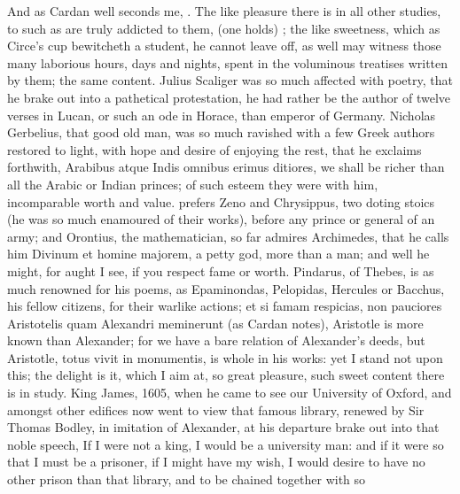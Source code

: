 {And as Cardan well seconds me, . The like pleasure there is in all other studies, to such as
are truly addicted to them,  (one holds) ; the like sweetness, which as Circe's cup bewitcheth a
student, he cannot leave off, as well may witness those many laborious
hours, days and nights, spent in the voluminous treatises written by
them; the same content. Julius Scaliger was so much affected with
poetry, that he brake out into a pathetical protestation, he had rather
be the author of twelve verses in Lucan, or such an ode in
Horace, than emperor of Germany. Nicholas Gerbelius, that
good old man, was so much ravished with a few Greek authors restored to
light, with hope and desire of enjoying the rest, that he exclaims
forthwith, Arabibus atque Indis omnibus erimus ditiores, we shall be
richer than all the Arabic or Indian princes; of such esteem they
were with him, incomparable worth and value. \Seneca prefers Zeno and
Chrysippus, two doting stoics (he was so much enamoured of their
works), before any prince or general of an army; and Orontius, the
mathematician, so far admires Archimedes, that he calls him Divinum et
homine majorem, a petty god, more than a man; and well he might, for
aught I see, if you respect fame or worth. Pindarus, of Thebes, is as
much renowned for his poems, as Epaminondas, Pelopidas, Hercules or
Bacchus, his fellow citizens, for their warlike actions; et si famam
respicias, non pauciores Aristotelis quam Alexandri meminerunt (as
Cardan notes), Aristotle is more known than Alexander; for we have a
bare relation of Alexander's deeds, but Aristotle, totus vivit in
monumentis, is whole in his works: yet I stand not upon this; the
delight is it, which I aim at, so great pleasure, such sweet content
there is in study. King James, 1605, when he came to see our
University of Oxford, and amongst other edifices now went to view that
famous library, renewed by Sir Thomas Bodley, in imitation of
Alexander, at his departure brake out into that noble speech, If I were
not a king, I would be a university man:  and if it were so that
I must be a prisoner, if I might have my wish, I would desire to have
no other prison than that library, and to be chained together with so
}

